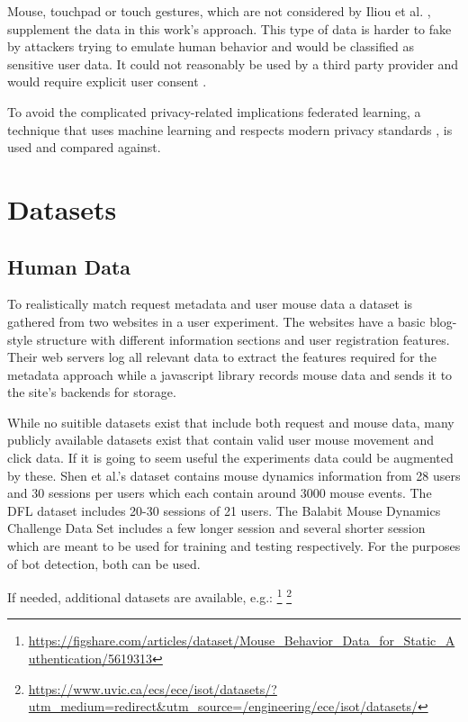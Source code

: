 \documentclass[
    fontsize=12pt,
    headings=small,
    parskip=half,           %
    bibliography=totoc,
    numbers=noenddot,       %
    open=any,               %
    final                   %
    ]{scrreprt}
\begin{document}
Mouse, touchpad or touch gestures, which are not considered by Iliou et al. \cite{10.1145/3339252.3339267}, supplement the data in this work's approach. This type of data is harder to fake by attackers trying to emulate human behavior and would be classified as sensitive user data. It could not reasonably be used by a third party provider and would require explicit user consent \cite{GDPR}.

To avoid the complicated privacy-related implications federated learning, a technique that uses machine learning and respects modern privacy standards \cite{DBLP:journals/corr/KonecnyMR15} \cite{DBLP:journals/corr/KonecnyMRR16}, is used and compared against.


\section{Datasets}


\subsection{Human Data}

To realistically match request metadata and user mouse data a dataset is gathered from two websites in a user experiment. The websites have a basic blog-style structure with different information sections and user registration features. Their web servers log all relevant data to extract the features required for the metadata approach while a javascript library records mouse data and sends it to the site's backends for storage.

While no suitible datasets exist that include both request and mouse data, many publicly available datasets exist that contain valid user mouse movement and click data. If it is going to seem useful the experiments data could be augmented by these.
Shen et al.'s \cite{6263955} dataset contains mouse dynamics information from 28 users and 30 sessions per users which each contain around 3000 mouse events.
The DFL dataset \cite{9111596} includes 20-30 sessions of 21 users.
The Balabit Mouse Dynamics Challenge Data Set \cite{BALABIT_CHALLENGE} includes a few longer session and several shorter session which are meant to be used for training and testing respectively. For the purposes of bot detection, both can be used.

If needed, additional datasets are available, e.g.:
\footnote{\url{https://figshare.com/articles/dataset/Mouse_Behavior_Data_for_Static_Authentication/5619313}}
\footnote{\url{https://www.uvic.ca/ecs/ece/isot/datasets/?utm_medium=redirect&utm_source=/engineering/ece/isot/datasets/}}
\end{document}
